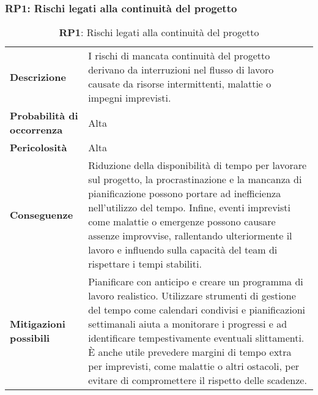 \subsubsection{RP1: Rischi legati alla continuità del progetto}
\begin{table}[h!]
    \centering
    \renewcommand{\arraystretch}{1.5} %
    \begin{tabularx}{\textwidth}{|X|X|}\hline
    \rowcolor[HTML]{FFD700} 
    \multicolumn{2}{|c|}{\textbf{Rischi legati alla mancata continuità del progetto}} \\ \hline
    \textbf{Descrizione} & I rischi di mancata continuità del progetto derivano da interruzioni nel flusso di lavoro causate da risorse intermittenti, malattie o impegni imprevisti.\\ \hline
    \textbf{Probabilità di occorrenza} & Alta \\ \hline
    \textbf{Pericolosità} & Alta \\ \hline
    \textbf{Conseguenze} & Riduzione della disponibilità di tempo per lavorare sul progetto, la procrastinazione e la mancanza di pianificazione possono portare ad inefficienza nell’utilizzo del tempo. Infine, eventi imprevisti come malattie o emergenze possono causare assenze improvvise, rallentando ulteriormente il lavoro e 
    influendo sulla capacità del team di rispettare i tempi stabiliti. \\ \hline
    \textbf{Mitigazioni possibili} & Pianificare con anticipo e creare un programma di lavoro realistico. Utilizzare strumenti di gestione del tempo come calendari condivisi e pianificazioni settimanali 
    aiuta a monitorare i progressi e ad identificare tempestivamente eventuali slittamenti. È anche utile prevedere margini di tempo extra per imprevisti, come malattie o altri ostacoli, per evitare di compromettere il rispetto delle scadenze.\\ \hline
    \end{tabularx}
    \caption{\textbf{RP1}: Rischi legati alla continuità del progetto}
    \end{table}

\newpage

